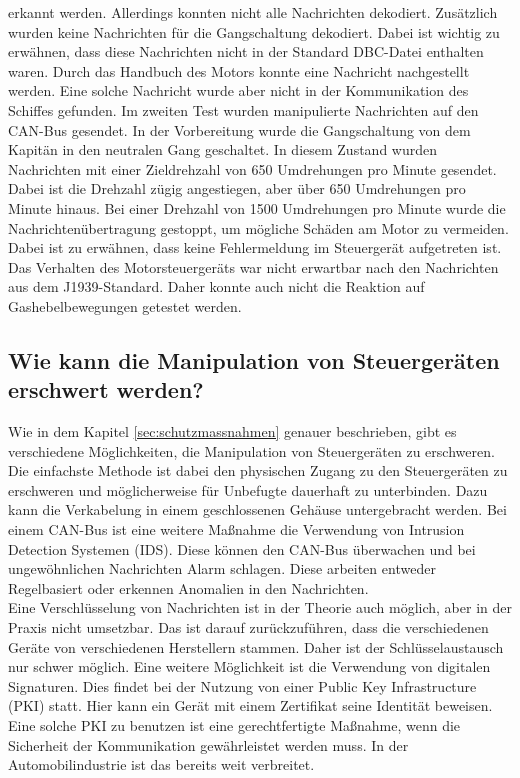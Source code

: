 erkannt werden. Allerdings konnten nicht alle Nachrichten dekodiert. Zusätzlich wurden keine Nachrichten für die Gangschaltung
dekodiert. Dabei ist wichtig zu erwähnen, dass diese Nachrichten nicht in der Standard DBC-Datei enthalten waren. Durch das Handbuch
des Motors konnte eine Nachricht nachgestellt werden. Eine solche Nachricht wurde aber nicht in der Kommunikation des Schiffes gefunden.
Im zweiten Test wurden manipulierte Nachrichten auf den CAN-Bus gesendet. In der Vorbereitung wurde die Gangschaltung von dem Kapitän in den neutralen
Gang geschaltet. In diesem Zustand wurden Nachrichten mit einer Zieldrehzahl von 650 Umdrehungen pro Minute gesendet. Dabei ist die 
Drehzahl zügig angestiegen, aber über 650 Umdrehungen pro Minute hinaus. Bei einer Drehzahl von 1500 Umdrehungen pro Minute wurde die
Nachrichtenübertragung gestoppt, um mögliche Schäden am Motor zu vermeiden. Dabei ist zu erwähnen, dass keine Fehlermeldung im Steuergerät 
aufgetreten ist. Das Verhalten des Motorsteuergeräts war nicht erwartbar nach den Nachrichten aus dem J1939-Standard. Daher
konnte auch nicht die Reaktion auf Gashebelbewegungen getestet werden. 

\subsection{Wie kann die Manipulation von Steuergeräten erschwert werden?}
Wie in dem Kapitel \ref{sec:schutzmassnahmen} genauer beschrieben, gibt es verschiedene Möglichkeiten, die Manipulation von Steuergeräten zu erschweren.
Die einfachste Methode ist dabei den physischen Zugang zu den Steuergeräten zu erschweren und möglicherweise für Unbefugte dauerhaft zu unterbinden.
Dazu kann die Verkabelung in einem geschlossenen Gehäuse untergebracht werden. 
Bei einem CAN-Bus ist eine weitere Maßnahme die Verwendung von Intrusion Detection Systemen (IDS).
Diese können den CAN-Bus überwachen und bei ungewöhnlichen Nachrichten Alarm schlagen. Diese arbeiten entweder Regelbasiert oder erkennen Anomalien in den Nachrichten.
\\
Eine Verschlüsselung von Nachrichten ist in der Theorie auch möglich, aber in der Praxis nicht umsetzbar. Das ist darauf zurückzuführen, dass die verschiedenen
Geräte von verschiedenen Herstellern stammen. Daher ist der Schlüsselaustausch nur schwer möglich. Eine weitere Möglichkeit ist die Verwendung von digitalen Signaturen.
Dies findet bei der Nutzung von einer Public Key Infrastructure (PKI) statt. Hier kann ein Gerät mit einem Zertifikat seine Identität beweisen. 
Eine solche PKI zu benutzen ist eine gerechtfertigte Maßnahme, wenn die Sicherheit der Kommunikation gewährleistet werden muss. In der Automobilindustrie
ist das bereits weit verbreitet. \\
